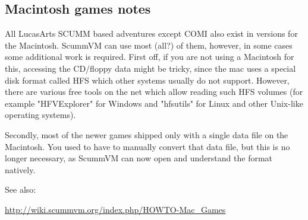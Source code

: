 \subsection{Macintosh games notes}

All LucasArts SCUMM based adventures except COMI also exist in versions for the
Macintosh. ScummVM can use most (all?) of them, however, in some cases some
additional work is required. First off, if you are not using a Macintosh for
this, accessing the CD/floppy data might be tricky, since the mac uses a
special disk format called HFS which other systems usually do not support.
However, there are various free tools on the net which allow reading such HFS
volumes (for example "HFVExplorer" for Windows and "hfsutils" for Linux and
other Unix-like operating systems).

Secondly, most of the newer games shipped only with a  single data file on the
Macintosh. You used to have to manually convert that data file, but this is no
longer necessary, as ScummVM can now open and understand the format natively.

See also:

  \url{http://wiki.scummvm.org/index.php/HOWTO-Mac_Games}


